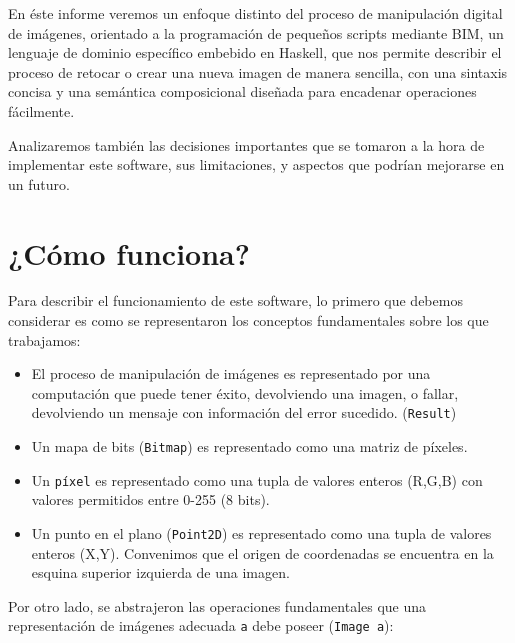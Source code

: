 \documentclass[a4paper, 11pt]{article} %
\begin{document}
En éste informe veremos un enfoque distinto del proceso de manipulación digital de imágenes, orientado a la programación de pequeños scripts mediante BIM, un lenguaje de dominio específico embebido en Haskell, que nos permite describir el proceso de retocar o crear una nueva imagen de manera sencilla, con una sintaxis concisa y una semántica composicional diseñada para encadenar operaciones fácilmente.

Analizaremos también las decisiones importantes que se tomaron a la hora de implementar este software, sus limitaciones, y aspectos que podrían mejorarse en un futuro.



\pagebreak


\section*{¿Cómo funciona?}

	Para describir el funcionamiento de este software, lo primero que debemos considerar es como se representaron los conceptos fundamentales sobre los que trabajamos:

	\begin{itemize}
	    \item El proceso de manipulación de imágenes es representado por una computación que puede tener éxito, devolviendo una imagen, o fallar, devolviendo un mensaje con información del error sucedido. (\texttt{Result})
		\item Un mapa de bits (\texttt{Bitmap}) es representado como una matriz de píxeles. 
		\item Un \texttt{píxel} es representado como una tupla de valores enteros	  (R,G,B) con valores permitidos entre 0-255 (8 bits).
		\item Un punto en el plano (\texttt{Point2D}) es representado como una tupla de valores enteros (X,Y). Convenimos que el origen de coordenadas se encuentra en la esquina superior izquierda de una imagen.
	\end{itemize} 

\noindent Por otro lado, se abstrajeron las operaciones fundamentales que una representación de imágenes adecuada \texttt{a} debe poseer (\texttt{Image a}):\\
	
\end{document}
